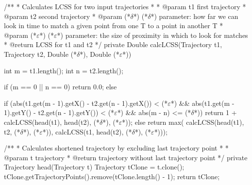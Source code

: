 /**
* Calculates LCSS for two input trajectories
*
* @param t1			first trajectory
* @param t2			second trajectory
* @param (*$\delta$*)			 (*$\delta$*) parameter: how far we can look in time to match a given point from one T to a point in another T
* @param (*$\varepsilon$*)			 (*$\varepsilon$*) parameter: the size of proximity in which to look for matches
* @return 			LCSS for t1 and t2
*/
private Double calcLCSS(Trajectory t1, Trajectory t2, Double (*$\delta$*), Double (*$\varepsilon$*)) {
	int m = t1.length();
	int n = t2.length();
	
	if (m == 0 || n == 0) {
		return 0.0;
	} else 
	
	if (abs(t1.get(m - 1).getX() - t2.get(n - 1).getX()) < (*$\varepsilon$*)
			&& abs(t1.get(m - 1).getY() - t2.get(n - 1).getY()) < (*$\varepsilon$*)
			&& abs(m - n) <= (*$\delta$*)) {
		return 1 + calcLCSS(head(t1), head(t2), (*$\delta$*), (*$\varepsilon$*));
	} else {
		return max(
			calcLCSS(head(t1), t2, (*$\delta$*), (*$\varepsilon$*)), 
			calcLCSS(t1, head(t2), (*$\delta$*), (*$\varepsilon$*)));
	}
}

/**
* Calculates shortened trajectory by excluding last trajectory point
*
* @param t trajectory
* @return trajectory without last trajectory point
*/
private Trajectory head(Trajectory t) {
	Trajectory tClone = t.clone();
	tClone.getTrajectoryPoints().remove(tClone.length() - 1);
	return tClone;
}
